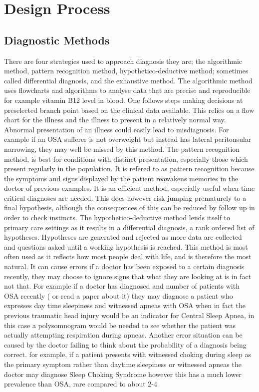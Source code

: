 \chapter{Design Process}

\section{Diagnostic Methods}
There are four strategies used to approach diagnosis they are; the algorithmic method, pattern recognition method, hypothetico-deductive method; sometimes called differential diagnosis, and the exhaustive method. 
The algorithmic method uses flowcharts and algorithms to analyse data that are precise and reproducible for example vitamin B12 level in blood. One follows steps making decisions at preselected branch point based on the clinical data available. This relies on a flow chart for the illness and the illness to present in a relatively normal way. Abnormal presentation of an illness could easily lead to misdiagnosis. For example if an OSA sufferer is not overweight but instead has lateral peritonsular narrowing, they may well be missed by this method. 
The pattern recognition method, is best for conditions with distinct presentation, especially those which present regularly in the population. It is refered to as pattern recognition because the symptoms and signs displayed by the patient reawakens memories in the doctor of previous examples. It is an efficient method, especially useful when time critical diagnoses are needed. This does however risk jumping prematurely to a final hypothesis, although the consequences of this can be reduced by follow up in order to check instincts. 
The hypothetico-deductive method lends itself to primary care settings as it results in a differential diagnosis, a rank ordered list of hypotheses. Hypotheses are generated and rejected as more data are collected and questions asked until a working hypothesis is reached. This method is most often used as it reflects how most people deal with life, and is therefore the most natural. It can cause errors if a doctor has been exposed to a certain diagnosis recently, they may choose to ignore signs that what they are looking at is in fact not that. For example if a doctor has diagnosed and number of patients with OSA recently ( or read a paper about it) they may diagnose a patient who expresses day time sleepiness and witnessed apneas with OSA when in fact the previous traumatic head injury would be an indicator for Central Sleep Apnea, in this case a polysomnogram would be needed to see whether the patient was actually attempting respiration during apneas. Another error situation can be caused by the doctor failing to think about the probability of a diagnosis being correct. for example, if a patient presents with witnessed choking during sleep as the primary symptom rather than daytime sleepiness or witnessed apneas the doctor may diagnose Sleep Choking Syndrome however this has a much lower prevalence than OSA, rare compared to about 2-4%
